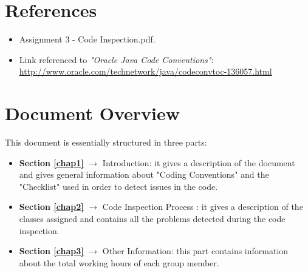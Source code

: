 

\section{References}
\begin{itemize}
	\item Assignment 3 - Code Inspection.pdf.
	\item Link referenced to \textit{"Oracle Java Code Conventions"}:\\
	\href{http://www.oracle.com/technetwork/java/codeconvtoc-136057.html} {http://www.oracle.com/technetwork/java/codeconvtoc-136057.html}
\end{itemize}

\section{Document Overview}
This document is essentially structured in three parts:
\begin{itemize}
	\item \textbf{Section \ref{chap1}} $\rightarrow$ Introduction: it gives a description of the document and gives general information about "Coding Conventions" and the "Checklist" used in order to detect issues in the code.
	\item \textbf{Section \ref{chap2}} $\rightarrow$ Code Inspection Process : it gives a description of the classes assigned and contains all the problems detected during the code inspection.
	\item \textbf{Section \ref{chap3}} $\rightarrow$ Other Information: this part contains information about the total working hours of each group member.
\end{itemize}